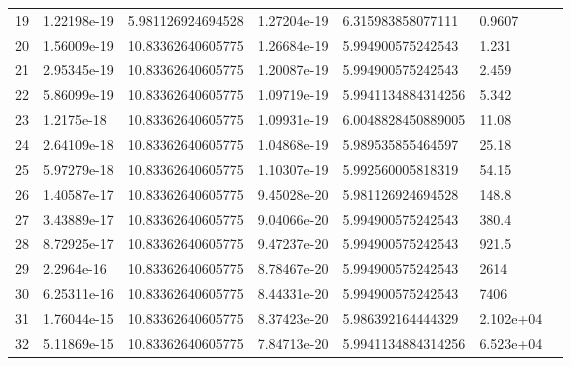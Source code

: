 \begin{tabular}{rllrllr}
19 & 1.22198e-19 & 5.981126924694528 & 1.27204e-19 & 6.315983858077111 & 0.9607\\
20 & 1.56009e-19 & 10.83362640605775 & 1.26684e-19 & 5.994900575242543 & 1.231\\
21 & 2.95345e-19 & 10.83362640605775 & 1.20087e-19 & 5.994900575242543 & 2.459\\
22 & 5.86099e-19 & 10.83362640605775 & 1.09719e-19 & 5.9941134884314256 & 5.342\\
23 & 1.2175e-18 & 10.83362640605775 & 1.09931e-19 & 6.0048828450889005 & 11.08\\
24 & 2.64109e-18 & 10.83362640605775 & 1.04868e-19 & 5.989535855464597 & 25.18\\
25 & 5.97279e-18 & 10.83362640605775 & 1.10307e-19 & 5.992560005818319 & 54.15\\
26 & 1.40587e-17 & 10.83362640605775 & 9.45028e-20 & 5.981126924694528 & 148.8\\
27 & 3.43889e-17 & 10.83362640605775 & 9.04066e-20 & 5.994900575242543 & 380.4\\
28 & 8.72925e-17 & 10.83362640605775 & 9.47237e-20 & 5.994900575242543 & 921.5\\
29 & 2.2964e-16 & 10.83362640605775 & 8.78467e-20 & 5.994900575242543 & 2614\\
30 & 6.25311e-16 & 10.83362640605775 & 8.44331e-20 & 5.994900575242543 & 7406\\
31 & 1.76044e-15 & 10.83362640605775 & 8.37423e-20 & 5.986392164444329 & 2.102e+04\\
32 & 5.11869e-15 & 10.83362640605775 & 7.84713e-20 & 5.9941134884314256 & 6.523e+04\\
\bottomrule
\end{tabular}

